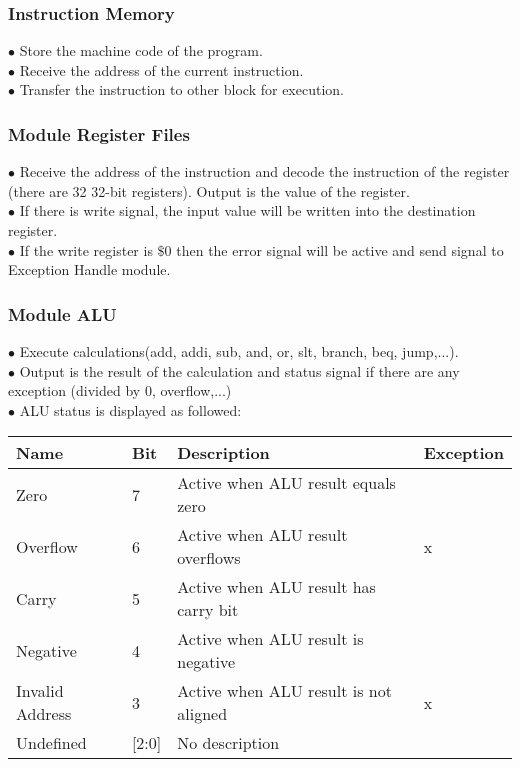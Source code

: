 \documentclass[12pt, a4paper, oneside]{article}
\begin{document}
    \subsubsection{Instruction Memory}
    $\bullet$ Store the machine code of the program. \\
    $\bullet$ Receive the address of the current instruction.\\
    $\bullet$ Transfer the instruction to other block for execution.
    
    \subsubsection{Module Register Files}
    $\bullet$ Receive the address of the instruction and decode the instruction of the register (there are 32 32-bit registers).  Output is the value of the register. \\
    $\bullet$ If there is write signal, the input value will be written into the destination register. \\
    $\bullet$ If the write register is $\$$0 then the error signal will be active and send signal to Exception Handle module.
    
    \subsubsection{Module ALU}
    $\bullet$ Execute calculations(add, addi, sub, and, or, slt, branch, beq, jump,...). \\
    $\bullet$ Output is the result of the calculation and status signal if there are any exception (divided by 0, overflow,...)\\
    $\bullet$ ALU status is displayed as followed:\\
    \begin{center}
    	\begin{tabular}[H]{|l|l|l|l|}
    	 \hline
    	 Name & Bit & Description & Exception \\ \hline
    	 Zero & 7 & Active when ALU result equals zero &  \\ \hline
    	 Overflow & 6 & Active when ALU result overflows & x \\ \hline
    	 Carry &  5 & Active when ALU result has carry bit & \\ \hline
    	 Negative & 4 & Active when ALU result is negative & \\ \hline
    	 Invalid Address & 3 & Active when ALU result is not aligned & x \\ \hline
    	 Undefined & [2:0] & No description & \\ \hline
    	 
    	\end{tabular}
	\end{center}
\end{document}
